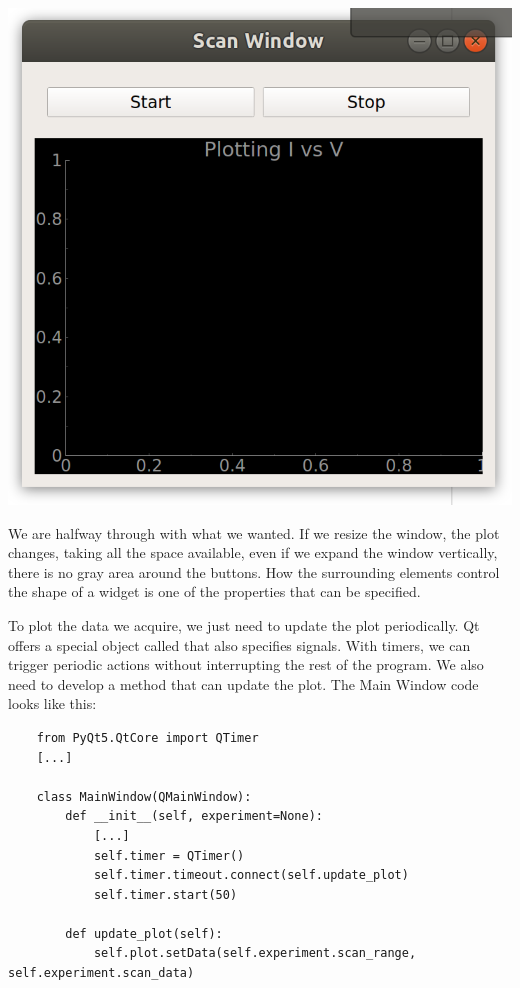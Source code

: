 \begin{center}
    \includegraphics[width=.4\textwidth]{images/Chapter_08/07_window_empty_plot.png}
\end{center}

We are halfway through with what we wanted. If we resize the window, the plot changes, taking all the space available, even if we expand the window vertically, there is no gray area around the buttons. How the surrounding elements control the shape of a widget is one of the properties that can be specified.


To plot the data we acquire, we just need to update the plot periodically. Qt offers a special object called  that also specifies signals. With timers, we can trigger periodic actions without interrupting the rest of the program. We also need to develop a method that can update the plot. The Main Window code looks like this:

\begin{verbatim}
    from PyQt5.QtCore import QTimer
    [...]

    class MainWindow(QMainWindow):
        def __init__(self, experiment=None):
            [...]
            self.timer = QTimer()
            self.timer.timeout.connect(self.update_plot)
            self.timer.start(50)

        def update_plot(self):
            self.plot.setData(self.experiment.scan_range, self.experiment.scan_data)
\end{verbatim}

